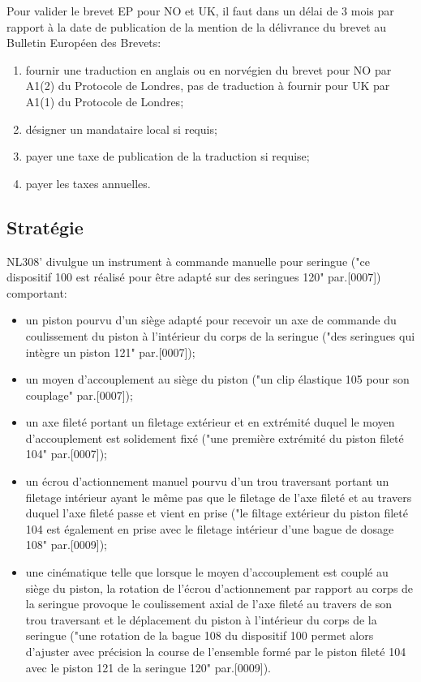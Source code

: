 Pour valider le brevet EP pour NO et UK, il faut dans un délai de 3 mois par rapport à la date
de publication de la mention de la délivrance du brevet au Bulletin Européen des Brevets:
\begin{enumerate}
        \renewcommand{\labelenumi}{\alph{enumi})}
    \item fournir une traduction en anglais ou en norvégien du brevet pour NO
    par A1(2) du Protocole de Londres, 
    pas de traduction à fournir pour UK par A1(1) du Protocole de Londres;
    \item désigner un mandataire local si requis;
    \item payer une taxe de publication de la traduction si requise;
    \item payer les taxes annuelles.
\end{enumerate}

\subsection{Stratégie}

NL308' divulgue un instrument à commande manuelle pour seringue ("ce dispositif 100 est réalisé pour être
    adapté sur des seringues 120" par.[0007]) comportant:
\begin{itemize}
    \item un piston pourvu d'un siège adapté pour recevoir un axe de commande du coulissement
    du piston à l'intérieur du corps de la seringue ("des seringues qui intègre un piston 121"
    par.[0007]);
    \item un moyen d'accouplement au siège du piston ("un clip élastique 105 pour son couplage"
    par.[0007]);
    \item un axe fileté portant un filetage extérieur et en extrémité duquel le moyen
    d'accouplement est solidement fixé ("une première extrémité du piston fileté 104" par.[0007]);
    \item un écrou d'actionnement manuel pourvu d'un trou traversant portant un filetage
    intérieur ayant le même pas que le filetage de l'axe fileté et au travers duquel l'axe
    fileté passe et vient en prise ("le filtage extérieur du piston fileté 104 est également en prise
    avec le filetage intérieur d'une bague de dosage 108" par.[0009]);
    \item une cinématique telle que lorsque le moyen d'accouplement est couplé au siège du piston,
    la rotation de l'écrou d'actionnement par rapport au corps de la seringue provoque le coulissement
    axial de l'axe fileté au travers de son trou traversant et le déplacement du piston à l'intérieur
    du corps de la seringue ("une rotation de la bague 108 du dispositif 100 permet alors d'ajuster
    avec précision la course de l'ensemble formé par le piston fileté 104 avec le piston 121 de la
    seringue 120" par.[0009]).\\
\end{itemize}

